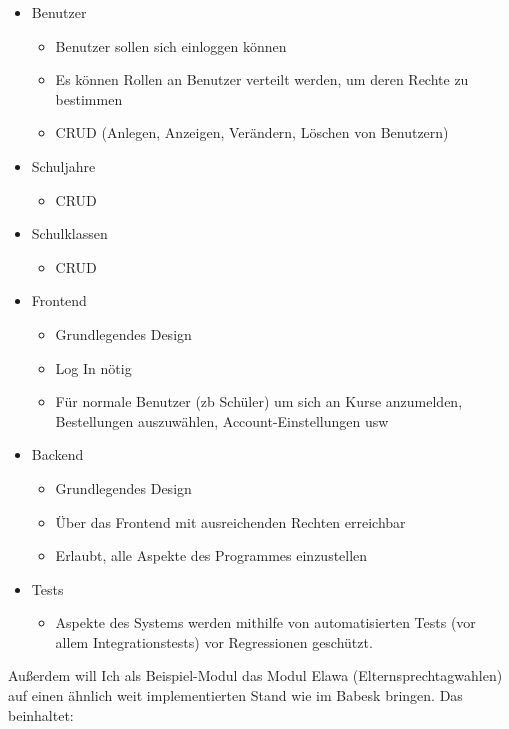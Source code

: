 \documentclass[a4paper,10pt]{scrartcl}
\begin{document}
  \begin{itemize}
    \item Benutzer
    \begin{itemize}
      \item Benutzer sollen sich einloggen können
      \item Es können Rollen an Benutzer verteilt werden, um deren Rechte zu
        bestimmen
      \item CRUD (Anlegen, Anzeigen, Verändern, Löschen von Benutzern)
    \end{itemize}
    \item Schuljahre
    \begin{itemize}
      \item CRUD
    \end{itemize}
    \item Schulklassen
    \begin{itemize}
      \item CRUD
    \end{itemize}
    \item Frontend
    \begin{itemize}
      \item Grundlegendes Design
      \item Log In nötig
      \item Für normale Benutzer (zb Schüler) um sich an Kurse anzumelden,
        Bestellungen auszuwählen, Account-Einstellungen usw
    \end{itemize}
    \item Backend
    \begin{itemize}
      \item Grundlegendes Design
      \item Über das Frontend mit ausreichenden Rechten erreichbar
      \item Erlaubt, alle Aspekte des Programmes einzustellen
    \end{itemize}
    \item Tests
    \begin{itemize}
      \item Aspekte des Systems werden mithilfe von automatisierten Tests (vor allem
        Integrationstests) vor Regressionen geschützt.
    \end{itemize}
  \end{itemize}

  Außerdem will Ich als Beispiel-Modul das Modul Elawa (Elternsprechtagwahlen)
  auf einen ähnlich weit implementierten Stand wie im Babesk bringen.
  Das beinhaltet:
\end{document}
